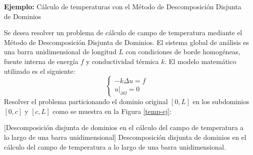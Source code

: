 \begin{EvalBox}{\textbf{Ejemplo:} Cálculo de temperaturas con el Método de Descomposición Disjunta de Dominios}

Se desea resolver un problema de cálculo de campo de temperatura mediante el Método de Descomposición Disjunta de Dominios.
El sistema global de análisis es una barra unidimensional de longitud $L$ con condiciones de borde homogéneas, fuente interna de energía $f$ y conductividad térmica $k$.
El modelo matemático utilizado es el siguiente:
\begin{equation}
\left\{\begin{matrix}
-k \Delta u=f \\
\left.u\right|_{\partial\Omega}=0
\end{matrix}\right.
\label{ecuacion-calor}
\end{equation}
Resolver el problema particionando el dominio original $[0,L]$ en los subdominios $[0,c]$ y $[c,L]$ como se muestra en la Figura \ref{temp-ej}:
    
  \centering
  [Descomposición disjunta de dominios en el cálculo del campo de temperatura a lo largo de una barra unidimensional]
  {Descomposición disjunta de dominios en el cálculo del campo de temperatura a lo largo de una barra unidimensional.}
  \label{temp-ej}
  
\end{EvalBox}

